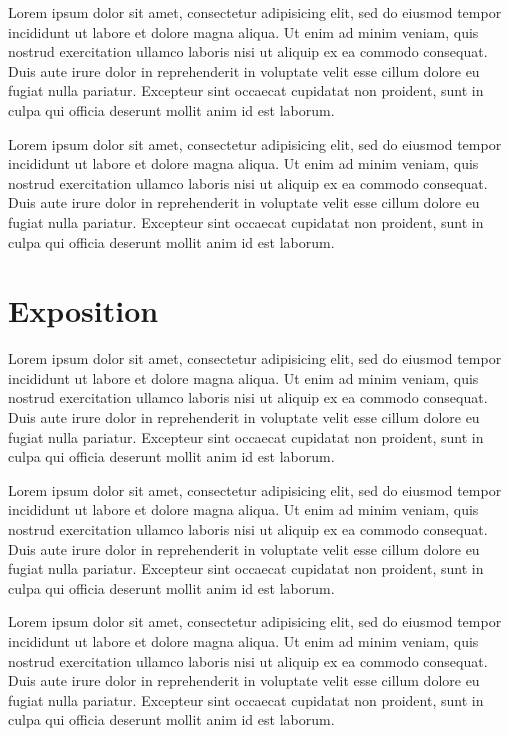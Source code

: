 \documentclass[conference]{style/acmsiggraph}
\begin{document}
Lorem ipsum dolor sit amet, consectetur adipisicing elit, sed do
eiusmod tempor incididunt ut labore et dolore magna aliqua. Ut enim ad
minim veniam, quis nostrud exercitation ullamco laboris nisi ut
aliquip ex ea commodo consequat. Duis aute irure dolor in
reprehenderit in voluptate velit esse cillum dolore eu fugiat nulla
pariatur. Excepteur sint occaecat cupidatat non proident, sunt in
culpa qui officia deserunt mollit anim id est laborum.

Lorem ipsum dolor sit amet, consectetur adipisicing elit, sed do
eiusmod tempor incididunt ut labore et dolore magna aliqua. Ut enim ad
minim veniam, quis nostrud exercitation ullamco laboris nisi ut
aliquip ex ea commodo consequat. Duis aute irure dolor in
reprehenderit in voluptate velit esse cillum dolore eu fugiat nulla
pariatur. Excepteur sint occaecat cupidatat non proident, sunt in
culpa qui officia deserunt mollit anim id est laborum.

\section{Exposition}

Lorem ipsum dolor sit amet, consectetur adipisicing elit, sed do
eiusmod tempor incididunt ut labore et dolore magna aliqua. Ut enim ad
minim veniam, quis nostrud exercitation ullamco laboris nisi ut
aliquip ex ea commodo consequat. Duis aute irure dolor in
reprehenderit in voluptate velit esse cillum dolore eu fugiat nulla
pariatur. Excepteur sint occaecat cupidatat non proident, sunt in
culpa qui officia deserunt mollit anim id est laborum.

Lorem ipsum dolor sit amet, consectetur adipisicing elit, sed do
eiusmod tempor incididunt ut labore et dolore magna aliqua. Ut enim ad
minim veniam, quis nostrud exercitation ullamco laboris nisi ut
aliquip ex ea commodo consequat. Duis aute irure dolor in
reprehenderit in voluptate velit esse cillum dolore eu fugiat nulla
pariatur. Excepteur sint occaecat cupidatat non proident, sunt in
culpa qui officia deserunt mollit anim id est laborum.

Lorem ipsum dolor sit amet, consectetur adipisicing elit, sed do
eiusmod tempor incididunt ut labore et dolore magna aliqua. Ut enim ad
minim veniam, quis nostrud exercitation ullamco laboris nisi ut
aliquip ex ea commodo consequat. Duis aute irure dolor in
reprehenderit in voluptate velit esse cillum dolore eu fugiat nulla
pariatur. Excepteur sint occaecat cupidatat non proident, sunt in
culpa qui officia deserunt mollit anim id est laborum.
\end{document}
